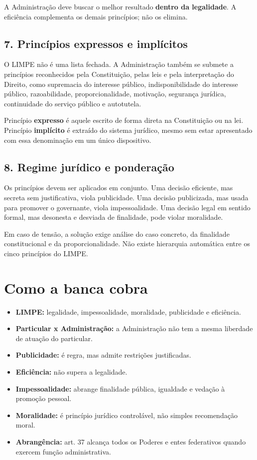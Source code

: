 \documentclass[11pt,a4paper]{article}
\begin{document}
A Administração deve buscar o melhor resultado \textbf{dentro da legalidade}. A eficiência complementa os demais princípios; não os elimina.

\subsection*{7. Princípios expressos e implícitos}

O LIMPE não é uma lista fechada. A Administração também se submete a princípios reconhecidos pela Constituição, pelas leis e pela interpretação do Direito, como supremacia do interesse público, indisponibilidade do interesse público, razoabilidade, proporcionalidade, motivação, segurança jurídica, continuidade do serviço público e autotutela.

Princípio \textbf{expresso} é aquele escrito de forma direta na Constituição ou na lei. Princípio \textbf{implícito} é extraído do sistema jurídico, mesmo sem estar apresentado com essa denominação em um único dispositivo.

\subsection*{8. Regime jurídico e ponderação}

Os princípios devem ser aplicados em conjunto. Uma decisão eficiente, mas secreta sem justificativa, viola publicidade. Uma decisão publicizada, mas usada para promover o governante, viola impessoalidade. Uma decisão legal em sentido formal, mas desonesta e desviada de finalidade, pode violar moralidade.

Em caso de tensão, a solução exige análise do caso concreto, da finalidade constitucional e da proporcionalidade. Não existe hierarquia automática entre os cinco princípios do LIMPE.

\section*{Como a banca cobra}

\begin{itemize}
  \item \textbf{LIMPE:} legalidade, impessoalidade, moralidade, publicidade e eficiência.
  \item \textbf{Particular x Administração:} a Administração não tem a mesma liberdade de atuação do particular.
  \item \textbf{Publicidade:} é regra, mas admite restrições justificadas.
  \item \textbf{Eficiência:} não supera a legalidade.
  \item \textbf{Impessoalidade:} abrange finalidade pública, igualdade e vedação à promoção pessoal.
  \item \textbf{Moralidade:} é princípio jurídico controlável, não simples recomendação moral.
  \item \textbf{Abrangência:} art. 37 alcança todos os Poderes e entes federativos quando exercem função administrativa.
\end{itemize}
\end{document}
